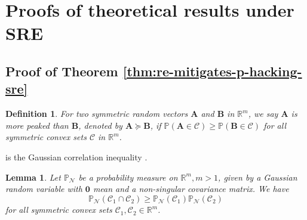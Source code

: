 \documentclass[12pt]{article}
\newtheorem{lemma}{Lemma}
\newtheorem{definition}{Definition}
\newcommand{\Lin}{\textnormal{L}}
\newcommand{\Prob}{\mathbb{P}}
\newcommand{\ma}{\mathcal{A}}
\newcommand{\rem}{\textnormal{rem}}
\newcommand{\rep}{\textnormal{rep}}
\newcommand{\bs}{\boldsymbol}
\newcommand{\hpL}{p_\textnormal{L}^{\textnormal{h}}}
\begin{document}


\section{Proofs of theoretical results under SRE}

\label{sec:results-under-sre}

\subsection{Proof of Theorem \ref{thm:re-mitigates-p-hacking-sre}}

\begin{definition}
    For two symmetric random vectors $\bs{A}$ and $\bs{B}$ in $\mathbb{R}^m$, we say $\bs{A}$ \emph{is more peaked than} $\bs{B}$, denoted by $\bs{A}\succeq \bs{B}$, if
$\Prob(\bs{A}\in\mathcal{C})\geq\Prob(\bs{B}\in\mathcal{C})$ for all symmetric convex sets $\mathcal{C}$ in $\mathbb{R}^m$.
\end{definition}

 is the Gaussian correlation inequality \citep{royen}.
\begin{lemma}
\label{lem:gaussian-correlation-inequality}
    Let $\Prob_{\mathcal{N}}$ be a probability measure on $\mathbb{R}^m,m>1$, given by a Gaussian random variable with  $\bs{0}$ mean and a non-singular covariance matrix. We have
$$\Prob_{\mathcal{N}}(\mathcal{C}_1\cap \mathcal{C}_2)\geq \Prob_{\mathcal{N}}(\mathcal{C}_1) \Prob_{\mathcal{N}}(\mathcal{C}_2)$$
for all symmetric convex sets $\mathcal{C}_1,\mathcal{C}_2\in\mathbb{R}^m$.
\end{lemma}
\end{document}
